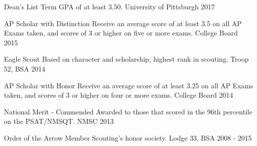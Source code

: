 
\vspace{-2mm}
\begin{cvhonors}

  \cvhonor
    {Dean's List} %
    {Term GPA of at least 3.50.} %
    {University of Pittsburgh} %
    {2017} %

  \cvhonor
    {AP Scholar with Distinction} %
    {Receive an average score of at least 3.5 on all AP Exams taken, and scores of 3 or higher on five or more exams.} %
    {College Board} %
    {2015} %

  \cvhonor
    {Eagle Scout} %
    {Based on character and scholarship, highest rank in scouting.} %
    {Troop 52, BSA} %
    {2014} %

  \cvhonor
    {AP Scholar with Honor} %
    {Receive an average score of at least 3.25 on all AP Exams taken, and scores of 3 or higher on four or more exams.} %
    {College Board} %
    {2014} %

  \cvhonor
    {National Merit - Commended} %
    {Awarded to those that scored in the 96th percentile on the PSAT/NMSQT.} %
    {NMSC} %
    {2013} %

  \cvhonor
    {Order of the Arrow Member} %
    {Scouting’s honor society.} %
    {Lodge 33, BSA} %
    {2008 - 2015} %

\end{cvhonors}
